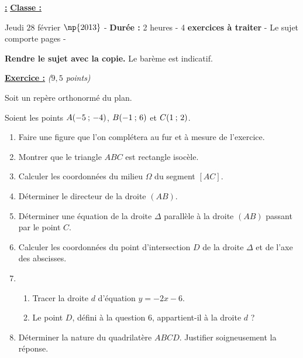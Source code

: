\documentclass[12pt,french]{book}
\renewenvironment{exo}[1]{%
  \refstepcounter{exo}\underline{\textbf{Exercice \theexo :}} \quad \textit{#1}\par
  \medskip}%
{\bigskip}
\begin{document}
\underline{\textbf{}}  \underline{\textbf{ :}}  \underline{\textbf{Classe :}} \medskip

{\sffamily
Jeudi $28$ février $\np{2013}$ - \textbf{Durée :} 2 heures - 4 \textbf{exercices à traiter} - Le sujet comporte \pageref{LastPage} pages - \medskip

\textbf{Rendre le sujet avec la copie.} Le barème est indicatif.
}\bigskip

\begin{exo}{($9,5$ points)}
    Soit \Oij un repère orthonormé du plan.\par 
    Soient les points $A(-5 \: ; \, -4)$, $B(-1 \: ; \, 6)$ et $C(1 \: ; \, 2)$.

    \begin{enumerate}
        \item Faire une figure que l'on complétera au fur et à mesure de l'exercice.
        \item Montrer que le triangle $ABC$ est rectangle isocèle.
        \item Calculer les coordonnées du milieu $\Omega$ du segment $[AC]$.
        \item Déterminer le \coef directeur de la droite $(AB)$.
        \item Déterminer une équation de la droite $\Delta$ parallèle à la droite $(AB)$ passant par le point $C$.
        \item Calculer les coordonnées du point d'intersection $D$ de la droite $\Delta$ et de l'axe des abscisses.
        \item \begin{enumerate}
                        \item Tracer la droite $d$ d'équation $y = -2 x - 6$.
                        \item Le point $D$, défini à la question 6, appartient-il à la droite $d$ ?
                \end{enumerate}
        \item Déterminer la nature du quadrilatère $ABCD$. Justifier soigneusement la réponse.
    \end{enumerate}
\end{exo}
\end{document}
